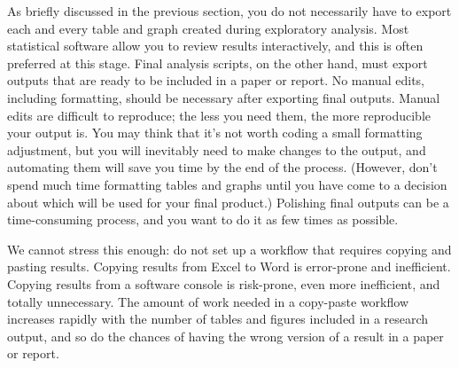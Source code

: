 As briefly discussed in the previous section,
you do not necessarily have to export each and every table and graph
created during exploratory analysis.
Most statistical software allow you to review results interactively,
and this is often preferred at this stage.
Final analysis scripts, on the other hand, must export outputs
that are ready to be included in a paper or report.
No manual edits, including formatting,
should be necessary after exporting final outputs.
Manual edits are difficult to reproduce;
the less you need them, the more reproducible your output is.
You may think that it's not worth coding a small formatting adjustment,
but you will inevitably need to make changes to the output,
and automating them will save you time by the end of the process.
(However, don't spend much time formatting tables and graphs until
you have come to a decision about which will be used for your final product.)
Polishing final outputs can be a time-consuming process,
and you want to do it as few times as possible.

We cannot stress this enough:
do not set up a workflow that requires copying and pasting results.
Copying results from Excel to Word is error-prone and inefficient.
Copying results from a software console is risk-prone,
even more inefficient, and totally unnecessary.
The amount of work needed in a copy-paste workflow increases
rapidly with the number of tables and figures included in a research output,
and so do the chances of having the wrong version of a result in a paper or report.

